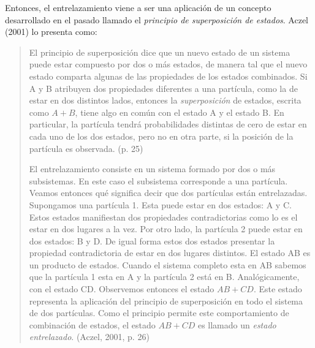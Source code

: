\documentclass[11pt,a4paper]{article}
\begin{document}
Entonces, el entrelazamiento viene a ser una aplicación de un concepto desarrollado en el pasado llamado el \textit{principio de superposición de estados}. Aczel (2001) lo presenta como:
\begin{quote}
El principio de superposición dice que un nuevo estado de un sistema puede estar compuesto por dos o más estados, de manera tal que el nuevo estado comparta algunas de las propiedades de los estados combinados. Si A y B atribuyen dos propiedades diferentes a una partícula, como la de estar en dos distintos lados, entonces la \textit{superposición} de estados, escrita como $A + B$, tiene algo en común con el estado A y el estado B. En particular, la partícula tendrá probabilidades distintas de cero de estar en cada uno de los dos estados, pero no en otra parte, si la posición de la partícula es observada. (p. 25)

El entrelazamiento consiste en un sistema formado por dos o más subsistemas. En este caso el subsistema corresponde a una partícula. Veamos entonces qué significa decir que dos partículas están entrelazadas. Supongamos una partícula 1. Esta puede estar en dos estados: A y C. Estos estados manifiestan dos propiedades contradictorias como lo es el estar en dos lugares a la vez. Por otro lado, la partícula 2 puede estar en dos estados: B y D. De igual forma estos dos estados presentar la propiedad contradictoria de estar en dos lugares distintos. El estado AB es un producto de estados. Cuando el sistema completo esta en AB sabemos que la partícula 1 esta en A y la partícula 2 está en B. Analógicamente, con el estado CD. Observemos entonces el estado $AB + CD$. Este estado representa la aplicación del principio de superposición en todo el sistema de dos partículas. Como el principio permite este comportamiento de combinación de estados, el estado $AB + CD$ es llamado un \textit{estado entrelazado}. (Aczel, 2001, p. 26)
\end{quote}
\end{document}
